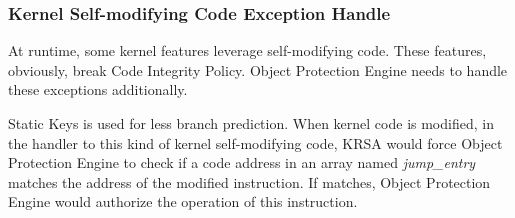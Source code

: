 \documentclass[conference]{IEEEtran}
\begin{document}
\subsubsection{Kernel Self-modifying Code Exception Handle} \label{sec:subselfcodeimp}
At runtime, some kernel features leverage self-modifying code. These features, obviously, break Code Integrity Policy. Object Protection Engine needs to handle these exceptions additionally. 

Static Keys is used for less branch prediction. When kernel code is modified, in the handler to this kind of kernel self-modifying code, KRSA would force Object Protection Engine to check if a code address in an array named \textit{jump\_entry} matches the address of the modified instruction. If matches, Object Protection Engine would authorize the operation of this instruction.  


\end{document}
